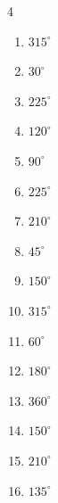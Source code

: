 \begin{multicols}{4}
\begin{enumerate}
  \item $\displaystyle 315^{\circ}$

  \item $\displaystyle 30^{\circ}$

  \item $\displaystyle 225^{\circ}$

  \item $\displaystyle 120^{\circ}$

  \item $\displaystyle 90^{\circ}$

  \item $\displaystyle 225^{\circ}$

  \item $\displaystyle 210^{\circ}$

  \item $\displaystyle 45^{\circ}$

  \item $\displaystyle 150^{\circ}$

  \item $\displaystyle 315^{\circ}$

  \item $\displaystyle 60^{\circ}$

  \item $\displaystyle 180^{\circ}$
        \phantom{$\displaystyle =\pi$}

  \item $\displaystyle 360^{\circ}$
        \phantom{$\displaystyle =2\pi$}

  \item $\displaystyle 150^{\circ}$

  \item $\displaystyle 210^{\circ}$

  \item $\displaystyle 135^{\circ}$


\end{enumerate}
\end{multicols}
